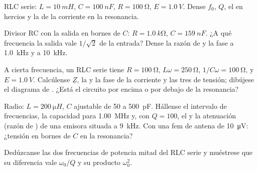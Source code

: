 \begin{exercise}[$\star$]\label{exo:b1:sinusoidal-impedance:4}
RLC serie: $L = \qty{10}{mH}$, $C = \qty{100}{nF}$, $R = \qty{100}{\ohm}$,
$E = \qty{1.0}{V}$. Dense $f_0$, $Q$, el  en hercios y la
 de la corriente en la resonancia.
\end{exercise}

\begin{exercise}[$\star\star$]\label{exo:b1:sinusoidal-impedance:5}
Divisor RC con la salida en bornes de $C$: $R = \qty{1.0}{k\ohm}$, $C = \qty{159}{nF}$.
¿A qué frecuencia la salida vale $1/\sqrt2$ de la entrada? Dense la razón
de  y la fase a \qty{1.0}{kHz} y a \qty{10}{kHz}.
\end{exercise}

\begin{exercise}[$\star\star$]\label{exo:b1:sinusoidal-impedance:6}
A cierta frecuencia, un RLC serie tiene $R = \qty{100}{\ohm}$, $L\omega =
\qty{250}{\ohm}$, $1/C\omega = \qty{100}{\ohm}$, y $E = \qty{1.0}{V}$.
Calcúlense $\underline Z$, la  y la fase de la corriente y las
tres  de tensión; dibújese el diagrama de . ¿Está el
circuito por encima o por debajo de la resonancia?
\end{exercise}

\begin{exercise}[$\star\star$]\label{exo:b1:sinusoidal-impedance:7}
Radio: $L = \qty{200}{\micro H}$, $C$ ajustable de \qty{50}{} a
\qty{500}{pF}. Hállense el intervalo de frecuencias, la capacidad para
\qty{1.00}{MHz} y, con $Q = 100$, el  y la atenuación (razón
de ) de una emisora situada a \qty{9}{kHz}. Con una fem de
antena de \qty{10}{\micro V}: ¿tensión en bornes de $C$ en la resonancia?
\end{exercise}

\begin{exercise}[$\star\star$]\label{exo:b1:sinusoidal-impedance:8}
Dedúzcanse las dos frecuencias de potencia mitad del RLC serie y
muéstrese que su diferencia vale $\omega_0/Q$ y su producto $\omega_0^2$.
\end{exercise}

